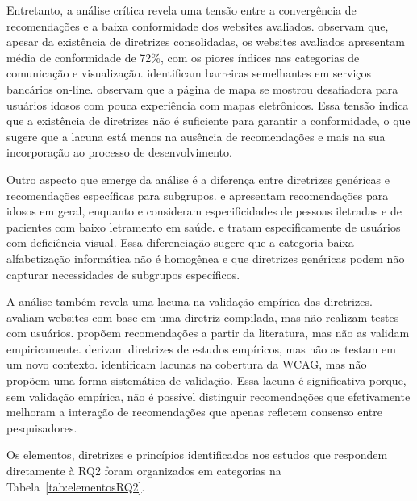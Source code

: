 Entretanto, a análise crítica revela uma tensão entre a convergência de recomendações e a baixa conformidade dos websites avaliados. \cite{dombrovskaia2021guideline} observam que, apesar da existência de diretrizes consolidadas, os websites avaliados apresentam média de conformidade de 72\%, com os piores índices nas categorias de comunicação e visualização. \cite{gatsou2017seniors} identificam barreiras semelhantes em serviços bancários on-line. \cite{xie2010usability} observam que a página de mapa se mostrou desafiadora para usuários idosos com pouca experiência com mapas eletrônicos. Essa tensão indica que a existência de diretrizes não é suficiente para garantir a conformidade, o que sugere que a lacuna está menos na ausência de recomendações e mais na sua incorporação ao processo de desenvolvimento.

Outro aspecto que emerge da análise é a diferença entre diretrizes genéricas e recomendações específicas para subgrupos. \cite{kurniawan2005research} e \cite{sun2010preliminary} apresentam recomendações para idosos em geral, enquanto \cite{filgueiras2009recoverability} e \cite{barron2013feasibility} consideram especificidades de pessoas iletradas e de pacientes com baixo letramento em saúde. \cite{gonzalez2025augmenting} e \cite{ramineni2024enhancing} tratam especificamente de usuários com deficiência visual. Essa diferenciação sugere que a categoria baixa alfabetização informática não é homogênea e que diretrizes genéricas podem não capturar necessidades de subgrupos específicos.

A análise também revela uma lacuna na validação empírica das diretrizes. \cite{dombrovskaia2021guideline} avaliam websites com base em uma diretriz compilada, mas não realizam testes com usuários. \cite{sun2010preliminary} propõem recomendações a partir da literatura, mas não as validam empiricamente. \cite{kurniawan2005research} derivam diretrizes de estudos empíricos, mas não as testam em um novo contexto. \cite{wickramathilaka2023addressing} identificam lacunas na cobertura da WCAG, mas não propõem uma forma sistemática de validação. Essa lacuna é significativa porque, sem validação empírica, não é possível distinguir recomendações que efetivamente melhoram a interação de recomendações que apenas refletem consenso entre pesquisadores.

Os elementos, diretrizes e princípios identificados nos estudos que respondem diretamente à RQ2 foram organizados em categorias na Tabela~\ref{tab:elementosRQ2}.



